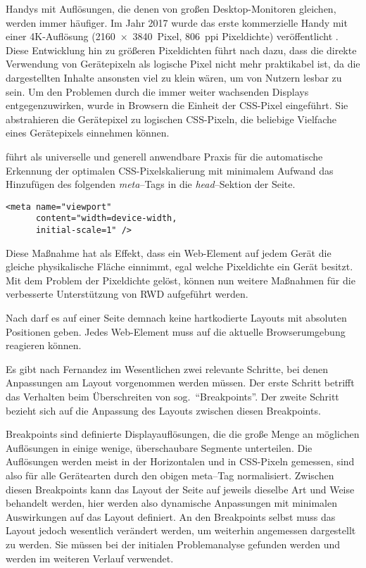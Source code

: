 Handys mit Auflösungen, die denen von großen Desktop-Monitoren gleichen, werden immer häufiger.
Im Jahr 2017 wurde das erste kommerzielle Handy mit einer 4K-Auflösung (2160 × 3840 Pixel, 806 ppi Pixeldichte) veröffentlicht \autocite{Wikipedia.SonyXperiaZ5Premium.2024}.
Diese Entwicklung hin zu größeren Pixeldichten führt nach \autocite{Harmsen.2018} dazu, dass die direkte Verwendung von Gerätepixeln als logische Pixel nicht mehr praktikabel ist, da die dargestellten Inhalte ansonsten viel zu klein wären, um von Nutzern lesbar zu sein.
Um den Problemen durch die immer weiter wachsenden Displays entgegenzuwirken, wurde in Browsern die Einheit der CSS-Pixel eingeführt.
Sie abstrahieren die Gerätepixel zu logischen CSS-Pixeln, die beliebige Vielfache eines Gerätepixels einnehmen können.

\autocite{JiangResponsiveWebDesignModeAndApplication.2014} führt als universelle und generell anwendbare Praxis für die automatische Erkennung der optimalen CSS-Pixelskalierung mit minimalem Aufwand das Hinzufügen des folgenden \emph{meta}--Tags in die \emph{head}--Sektion der Seite.

\begin{verbatim}
<meta name="viewport"
      content="width=device-width,
      initial-scale=1" />
\end{verbatim}

Diese Maßnahme hat als Effekt, dass ein Web-Element auf jedem Gerät die gleiche physikalische Fläche einnimmt, egal welche Pixeldichte ein Gerät besitzt.
Mit dem Problem der Pixeldichte gelöst, können nun weitere Maßnahmen für die verbesserte Unterstützung von RWD aufgeführt werden.

Nach \autocite{Katajisto.CreatingSupportContent.2015} darf es auf einer Seite demnach keine hartkodierte Layouts mit absoluten Positionen geben.
Jedes Web-Element muss auf die aktuelle Browserumgebung reagieren können.

Es gibt nach Fernandez \autocite[S. 3]{MobileWebResponsiveWebdesign.Fernandez.2012} im Wesentlichen zwei relevante Schritte, bei denen Anpassungen am Layout vorgenommen werden müssen.
Der erste Schritt betrifft das Verhalten beim Überschreiten von sog.\ "`Breakpoints"'.
Der zweite Schritt bezieht sich auf die Anpassung des Layouts zwischen diesen Breakpoints.

Breakpoints sind definierte Displayauflösungen, die die große Menge an möglichen Auflösungen in einige wenige, überschaubare Segmente unterteilen.
Die Auflösungen werden meist in der Horizontalen und in CSS-Pixeln gemessen, sind also für alle Gerätearten durch den obigen meta--Tag normalisiert.
Zwischen diesen Breakpoints kann das Layout der Seite auf jeweils dieselbe Art und Weise behandelt werden, hier werden also dynamische Anpassungen mit minimalen Auswirkungen auf das Layout definiert.
An den Breakpoints selbst muss das Layout jedoch wesentlich verändert werden, um weiterhin angemessen dargestellt zu werden.
Sie müssen bei der initialen Problemanalyse gefunden werden und werden im weiteren Verlauf verwendet.

